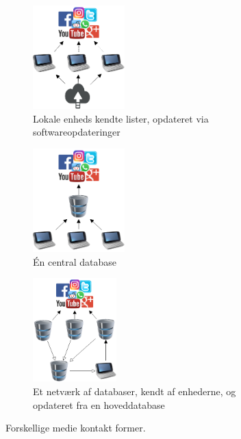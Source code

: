 \begin{figure}[H]
    \begin{subfigure}{0.33\textwidth}
        \centering
        \includegraphics[width=0.7\linewidth, height=4cm]{Projectdoc/Assets/Illustrationer/Device_Opdate.png} 
        \caption{Lokale enheds kendte lister, opdateret via softwareopdateringer}
        \label{fig:DeviceOpdate}
    \end{subfigure}
    \begin{subfigure}{0.33\textwidth}
        \centering
        \includegraphics[width=0.7\linewidth, height=4cm]{Projectdoc/Assets/Illustrationer/CentralDatabase.png}
        \caption{Én central database}
        \label{fig:CentralDatabaseList}
    \end{subfigure}
    \begin{subfigure}{0.33\textwidth}
        \centering
        \includegraphics[width=0.7\linewidth, height=4cm]{Projectdoc/Assets/Illustrationer/MainDomainServer.png}
        \caption{Et netværk af databaser, kendt af enhederne, og opdateret fra en hoveddatabase}
        \label{fig:MainDomain}
    \end{subfigure}
    \caption{Forskellige medie kontakt former.}
    \label{fig:MedieContact}
\end{figure}

